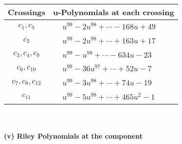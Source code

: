 \documentclass[1p]{elsarticle_modified}
\theoremstyle{definition}
\begin{document}
\begin{tabular}{m{50pt}|m{274pt}}
Crossings & \hspace{64pt}u-Polynomials at each crossing \\
\hline $$\begin{aligned}c_{1},c_{5}\end{aligned}$$&$\begin{aligned}
&u^{99}-2 u^{98}+\cdots-168 u+49
\end{aligned}$\\
\hline $$\begin{aligned}c_{2}\end{aligned}$$&$\begin{aligned}
&u^{99}-2 u^{98}+\cdots+163 u+17
\end{aligned}$\\
\hline $$\begin{aligned}c_{3},c_{4},c_{9}\end{aligned}$$&$\begin{aligned}
&u^{99}- u^{98}+\cdots-634 u-23
\end{aligned}$\\
\hline $$\begin{aligned}c_{6},c_{10}\end{aligned}$$&$\begin{aligned}
&u^{99}-36 u^{97}+\cdots+52 u-7
\end{aligned}$\\
\hline $$\begin{aligned}c_{7},c_{8},c_{12}\end{aligned}$$&$\begin{aligned}
&u^{99}-3 u^{98}+\cdots+74 u-19
\end{aligned}$\\
\hline $$\begin{aligned}c_{11}\end{aligned}$$&$\begin{aligned}
&u^{99}-5 u^{98}+\cdots+465 u^2-1
\end{aligned}$\\
\hline
\end{tabular}\\~\\
\newpage\renewcommand{\arraystretch}{1}
\flushleft \textbf{(v) Riley Polynomials at the component}\newline \\
\end{document}
